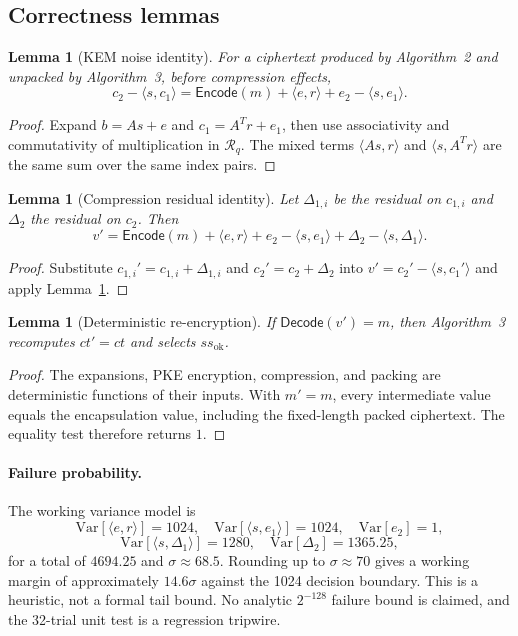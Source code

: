 \documentclass[11pt,a4paper]{article}
\theoremstyle{plain}
\newtheorem{lemma}[theorem]{Lemma}
\theoremstyle{definition}
\theoremstyle{remark}
\newcommand{\Ring}{\mathcal{R}_q}
\newcommand{\Encode}{\mathsf{Encode}}
\newcommand{\Decode}{\mathsf{Decode}}
\begin{document}
\subsection{Correctness lemmas}

\begin{lemma}[KEM noise identity]
\label{lem:kem-noise}
For a ciphertext produced by Algorithm~2 and unpacked by Algorithm~3,
before compression effects,
\[
 c_2-\langle s,c_1\rangle
 =\Encode(m)+\langle e,r\rangle+e_2-\langle s,e_1\rangle.
\]
\end{lemma}

\begin{proof}
Expand $b=A s+e$ and $c_1=A^T r+e_1$, then use associativity and
commutativity of multiplication in $\Ring$.  The mixed terms
$\langle A s,r\rangle$ and $\langle s,A^T r\rangle$ are the same sum
over the same index pairs.
\end{proof}

\begin{lemma}[Compression residual identity]
\label{lem:kem-residual}
Let $\Delta_{1,i}$ be the residual on $c_{1,i}$ and $\Delta_2$ the
residual on $c_2$.  Then
\[
 v'=\Encode(m)+\langle e,r\rangle+e_2-\langle s,e_1\rangle
 +\Delta_2-\langle s,\Delta_1\rangle.
\]
\end{lemma}

\begin{proof}
Substitute $c_{1,i}'=c_{1,i}+\Delta_{1,i}$ and
$c_2'=c_2+\Delta_2$ into $v'=c_2'-\langle s,c_1'\rangle$ and apply
Lemma~\ref{lem:kem-noise}.
\end{proof}

\begin{lemma}[Deterministic re-encryption]
\label{lem:kem-reenc}
If $\Decode(v')=m$, then Algorithm~3 recomputes $ct'=ct$ and selects
$ss_{\mathrm{ok}}$.
\end{lemma}

\begin{proof}
The expansions, PKE encryption, compression, and packing are
deterministic functions of their inputs.  With $m'=m$, every
intermediate value equals the encapsulation value, including the
fixed-length packed ciphertext.  The equality test therefore returns
$1$.
\end{proof}

\paragraph{Failure probability.}
The working variance model is
\[
 \mathrm{Var}[\langle e,r\rangle]=1024,\quad
 \mathrm{Var}[\langle s,e_1\rangle]=1024,\quad
 \mathrm{Var}[e_2]=1,
\]
\[
 \mathrm{Var}[\langle s,\Delta_1\rangle]=1280,\quad
 \mathrm{Var}[\Delta_2]=1365.25,
\]
for a total of $4694.25$ and $\sigma\approx68.5$.  Rounding up to
$\sigma\approx70$ gives a working margin of approximately
$14.6\sigma$ against the 1024 decision boundary.  This is a heuristic,
not a formal tail bound.  No analytic $2^{-128}$ failure bound is
claimed, and the 32-trial unit test is a regression tripwire.
\end{document}
